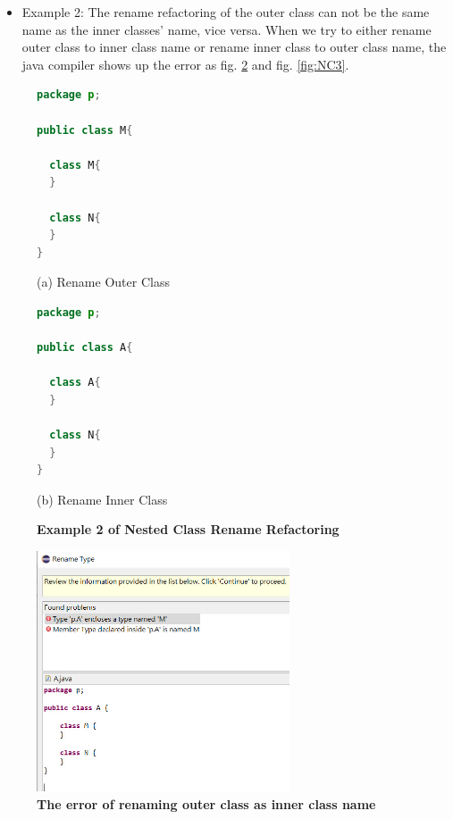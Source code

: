 \begin{itemize}
\item Example 2: The rename refactoring of the outer class can not be the same name as the inner classes' name, vice versa. When we try to either rename outer class to inner class name or rename inner class to outer class name, the java compiler shows up the error as fig. \ref{fig:NC2} and fig. \ref{fig:NC3}.
\end{itemize}

\begin{figure}[th]
\centering
\begin{minipage}[t]{0.45\linewidth}
\begin{lstlisting}[language=java, basicstyle=\scriptsize\ttfamily,frame=single]
package p;

public class M{	
  
  class M{
  }
	
  class N{
  }
} 
\end{lstlisting}
\tiny{(a) Rename Outer Class}
\end{minipage}
\hfill
\begin{minipage}[t]{0.45\linewidth}
\begin{lstlisting}[language=java, basicstyle=\scriptsize\ttfamily,frame=single]
package p;

public class A{	
    
  class A{
  }
    
  class N{
  }
} 
\end{lstlisting}
\tiny{(b) Rename Inner Class}
\end{minipage}
\caption{\textbf{Example 2 of Nested Class Rename Refactoring}}
\label{fig:nestedclass2}
\end{figure}

\begin{figure}[H]
\centerline{\includegraphics[width=75mm,scale=0.4]{NC2.jpg}}
\caption{\textbf{The error of renaming outer class as inner class name}}
\label{fig:NC2}
\end{figure}

